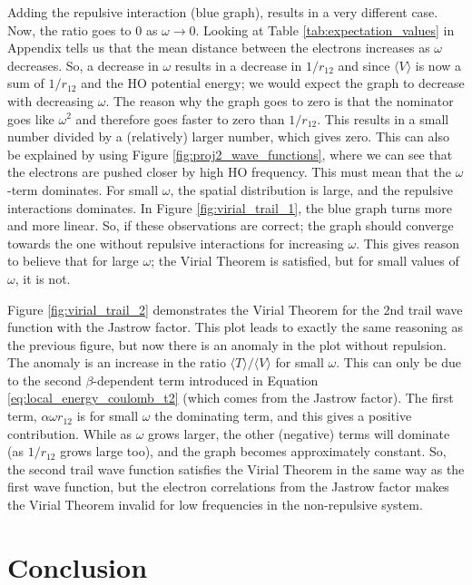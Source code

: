 \documentclass[12pt,english,a4paper]{article}
\begin{document}
Adding the repulsive interaction (blue graph), results in a very different case. Now, the ratio goes to $0$ as $\omega \rightarrow 0$. Looking at Table \ref{tab:expectation_values} in Appendix tells us that the mean distance between the electrons increases as $\omega$ decreases. So, a decrease in $\omega$ results in a decrease in $1/r_{12}$ and since $\langle V\rangle$ is now a sum of $1/r_{12}$ and the HO potential energy; we would expect the graph to decrease with decreasing $\omega$. The reason why the graph goes to zero is that the nominator goes like $\omega^2$ and therefore goes faster to zero than $1/r_{12}$. This results in a small number divided by a (relatively) larger number, which gives zero. This can also be explained by using Figure \ref{fig:proj2_wave_functions}, where we can see that the electrons are pushed closer by high HO frequency. This must mean that the $\omega$-term dominates. For small $\omega$, the spatial distribution is large, and the repulsive interactions dominates. In Figure \ref{fig:virial_trail_1}, the blue  graph turns more and more linear. So, if these observations are correct; the graph should converge towards the one without repulsive interactions for increasing $\omega$. This gives reason to believe that for large $\omega$; the Virial Theorem is satisfied, but for small values of $\omega$, it is not.

Figure \ref{fig:virial_trail_2} demonstrates the Virial Theorem for the 2nd trail wave function with the Jastrow factor. This plot leads to exactly the same reasoning as the previous figure, but now there is an anomaly in the plot without repulsion. The anomaly is an increase in the ratio $\langle T\rangle /\langle V\rangle$ for small $\omega$. This can only be due to the second $\beta$-dependent term introduced in Equation \eqref{eq:local_energy_coulomb_t2} (which comes from the Jastrow factor). The first term, $\alpha\omega r_{12}$ is for small $\omega$ the dominating term, and this gives a positive contribution. While as $\omega$ grows larger, the other (negative) terms will dominate (as $1/r_{12}$ grows large too), and the graph becomes approximately constant. So, the second trail wave function satisfies the Virial Theorem in the same way as the first wave function, but the electron correlations from the Jastrow factor makes the Virial Theorem invalid for low frequencies in the non-repulsive system. 

\section{Conclusion} \label{section:conclusion}
\end{document}
